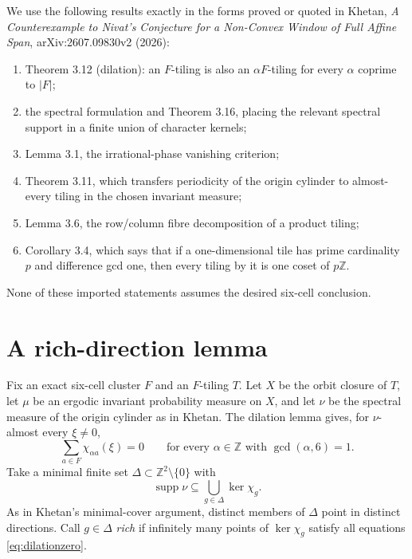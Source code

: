 \documentclass[11pt]{article}
\newcommand{\Z}{\mathbb Z}
\begin{document}
We use the following results exactly in the forms proved or quoted in Khetan, \emph{A Counterexample to Nivat's Conjecture for a Non-Convex Window of Full Affine Span}, arXiv:2607.09830v2 (2026):
\begin{enumerate}
\item Theorem 3.12 (dilation): an $F$-tiling is also an $\alpha F$-tiling for every $\alpha$ coprime to $|F|$;
\item the spectral formulation and Theorem 3.16, placing the relevant spectral support in a finite union of character kernels;
\item Lemma 3.1, the irrational-phase vanishing criterion;
\item Theorem 3.11, which transfers periodicity of the origin cylinder to almost-every tiling in the chosen invariant measure;
\item Lemma 3.6, the row/column fibre decomposition of a product tiling;
\item Corollary 3.4, which says that if a one-dimensional tile has prime cardinality $p$ and difference gcd one, then every tiling by it is one coset of $p\Z$.
\end{enumerate}
None of these imported statements assumes the desired six-cell conclusion.

\section{A rich-direction lemma}
Fix an exact six-cell cluster $F$ and an $F$-tiling $T$. Let $X$ be the orbit closure of $T$, let $\mu$ be an ergodic invariant probability measure on $X$, and let $\nu$ be the spectral measure of the origin cylinder as in Khetan. The dilation lemma gives, for $\nu$-almost every $\xi\ne0$,
\begin{equation}\label{eq:dilationzero}
 \sum_{a\in F}\chi_{\alpha a}(\xi)=0
 \qquad\text{for every }\alpha\in\Z\text{ with }\gcd(\alpha,6)=1.
\end{equation}
Take a minimal finite set $\Delta\subset\Z^2\setminus\{0\}$ with
\[
 \operatorname{supp}\nu\subseteq\bigcup_{g\in\Delta}\ker\chi_g.
\]
As in Khetan's minimal-cover argument, distinct members of $\Delta$ point in distinct directions. Call $g\in\Delta$ \emph{rich} if infinitely many points of $\ker\chi_g$ satisfy all equations \eqref{eq:dilationzero}.
\end{document}

